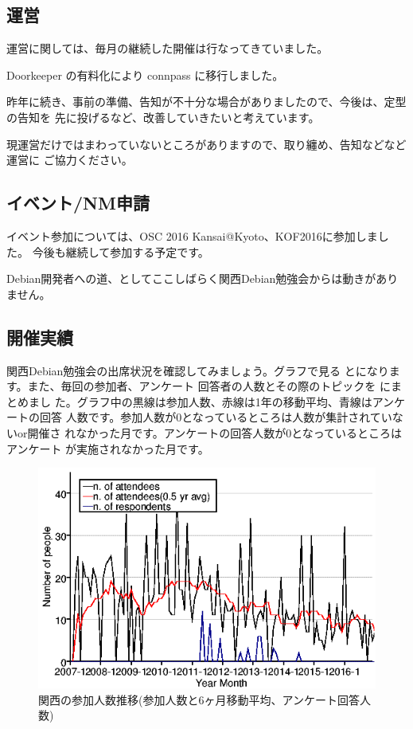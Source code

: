 \documentclass[mingoth,a4paper]{jsarticle}
\begin{document}
\subsection{運営}

運営に関しては、毎月の継続した開催は行なってきていました。

Doorkeeper の有料化により connpass に移行しました。

昨年に続き、事前の準備、告知が不十分な場合がありましたので、今後は、定型の告知を
先に投げるなど、改善していきたいと考えています。

現運営だけではまわっていないところがありますので、取り纏め、告知などなど運営に
ご協力ください。

\subsection{イベント/NM申請}

イベント参加については、OSC 2016 Kansai@Kyoto、KOF2016に参加しました。
今後も継続して参加する予定です。

Debian開発者への道、としてここしばらく関西Debian勉強会からは動きがありません。

\subsection{開催実績}

関西Debian勉強会の出席状況を確認してみましょう。グラフで見る
とになります。また、毎回の参加者、アンケート
回答者の人数とその際のトピックを  にまとめまし
た。グラフ中の黒線は参加人数、赤線は1年の移動平均、青線はアンケートの回答
人数です。参加人数が$0$となっているところは人数が集計されていないor開催さ
れなかった月です。アンケートの回答人数が$0$となっているところはアンケート
が実施されなかった月です。

%
\begin{figure}[h]
  \begin{center}
    \includegraphics[width=.6\hsize]{image201612/memberanalysis/kansai.png}
  \end{center}
  \caption{関西の参加人数推移(参加人数と6ヶ月移動平均、アンケート回答人数)}
  \label{fig:kansaipeoplechart}
\end{figure}
\end{document}
